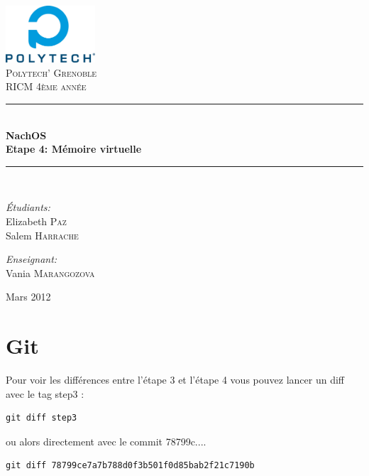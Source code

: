 \documentclass[a4paper,10pt]{article}
\newcommand{\HRule}{\rule{\linewidth}{0.6mm}}
\begin{document}
\begin{titlepage}

\begin{center}


\includegraphics[width=0.25\textwidth]{../images/logo}\\[1cm]

\textsc{\LARGE Polytech' Grenoble}\\[1.5cm]

\textsc{\Large RICM 4\`eme ann\'ee}\\[1.2cm]


\HRule \\[0.4cm]
{ \huge \bfseries NachOS\\[0.6cm]
Etape 4: Mémoire virtuelle}
\\[0.4cm]

\HRule \\[2cm]

\begin{minipage}{0.4\textwidth}
\begin{flushleft} \large
\emph{\'Etudiants:}\\
Elizabeth \textsc{Paz} \\
Salem \textsc{Harrache}
\end{flushleft}
\end{minipage}
\begin{minipage}{0.4\textwidth}
\begin{flushright} \large
\emph{Enseignant:} \\
Vania \textsc{Marangozova}
\end{flushright}
\end{minipage}

\vfill

{\large  Mars 2012}

\end{center}

\end{titlepage}

\section{Git}

Pour voir les différences entre l'étape 3 et l'étape 4 vous pouvez lancer un
diff avec le tag step3 :
\begin{lstlisting}
git diff step3
\end{lstlisting}
ou alors directement avec le commit 78799c....
\begin{lstlisting}
git diff 78799ce7a7b788d0f3b501f0d85bab2f21c7190b
\end{lstlisting}
\end{document}
